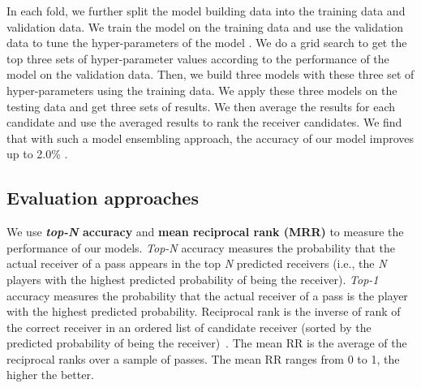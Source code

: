 In each fold, we further split the model building data into the training data and validation data.
We train the model on the training data and use the validation data to tune the hyper-parameters of the model .
We do a grid search to get the top three sets of hyper-parameter values according to the performance of the model on the validation data.
Then, we build three models with these three set of hyper-parameters using the training data. 
We apply these three models on the testing data and get three sets of results.
We then average the results for each candidate and use the averaged results to rank the receiver candidates. We find that with such a model ensembling approach, the accuracy of our model improves up to 2.0\% .




\subsection{Evaluation approaches}

We use \textbf{\textit{top-N} accuracy} and \textbf{mean reciprocal rank (MRR)} to measure the performance of our models.
\textit{Top-N} accuracy measures the probability that the actual receiver of a pass appears in the top \textit{N} predicted receivers (i.e., the \textit{N} players with the highest predicted probability of being the receiver).
\textit{Top-1} accuracy measures the probability that the actual receiver of a pass is the player with the highest predicted probability.
Reciprocal rank is the inverse of rank of the correct receiver in an ordered list of candidate receiver (sorted by the predicted probability of being the receiver)~\cite{Craswell2009}.
The mean RR is the average of the reciprocal ranks over a sample of passes. The mean RR ranges from 0 to 1, the higher the better.
 
